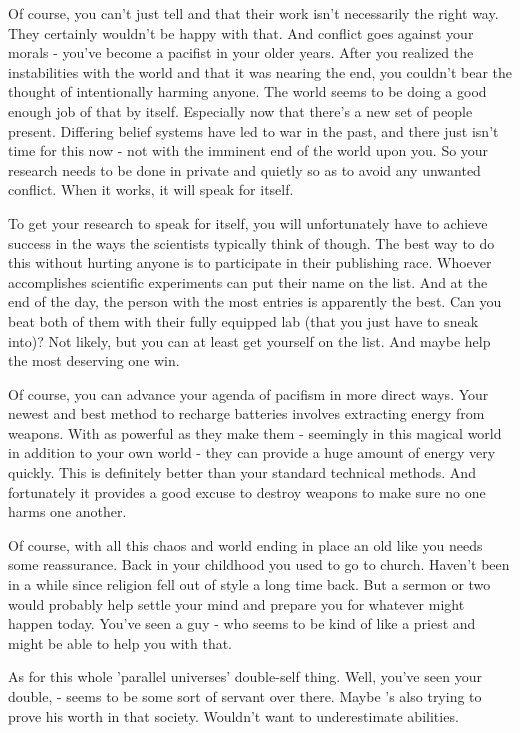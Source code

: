 \documentclass[char]{guildcamp3}
\begin{document}
Of course, you can't just tell \cSciOne{\informal} and \cSciTwo{\informal} that their work isn't necessarily the right way. They certainly wouldn't be happy with that. And conflict goes against your morals - you've become a pacifist in your older years. After you realized the instabilities with the world and that it was nearing the end, you couldn't bear the thought of intentionally harming anyone. The world seems to be doing a good enough job of that by itself. Especially now that there's a new set of people present. Differing belief systems have led to war in the past, and there just isn't time for this now - not with the imminent end of the world upon you. So your research needs to be done in private and quietly so as to avoid any unwanted conflict. When it works, it will speak for itself. 

To get your research to speak for itself, you will unfortunately have to achieve success in the ways the scientists typically think of though. The best way to do this without hurting anyone is to participate in their publishing race. Whoever accomplishes scientific experiments can put their name on the list. And at the end of the day, the person with the most entries is apparently the best. Can you beat both of them with their fully equipped lab (that you just have to sneak into)? Not likely, but you can at least get yourself on the list. And maybe help the most deserving one win.

Of course, you can advance your agenda of pacifism in more direct ways. Your newest and best method to recharge batteries involves extracting energy from weapons. With as powerful as they make them - seemingly in this magical world in addition to your own world - they can provide a huge amount of energy very quickly. This is definitely better than your standard technical methods. And fortunately it provides a good excuse to destroy weapons to make sure no one harms one another.

Of course, with all this chaos and world ending in place an old \pronoun{\human} like you needs some reassurance. Back in your childhood you used to go to church. Haven't been in a while since religion fell out of style a long time back. But a sermon or two would probably help settle your mind and prepare you for whatever might happen today. You've seen a guy - \cPaladin{\intro} who seems to be kind of like a priest and might be able to help you with that. 

As for this whole 'parallel universes' double-self thing. Well, you've seen your double, \cServant{\intro} - seems to be some sort of servant over there. Maybe \cServant{\they}'s also trying to prove his worth in that society. Wouldn't want to underestimate \cServant{\their} abilities.
\end{document}
